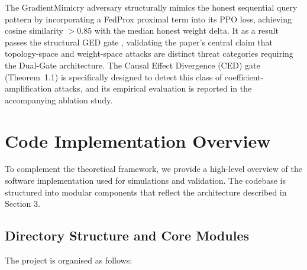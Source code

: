 \documentclass[journal]{IEEEtran}
\begin{document}
The GradientMimicry adversary structurally mimics the honest sequential query pattern by incorporating a FedProx proximal term into its PPO loss, achieving cosine similarity $>0.85$ with the median honest weight delta. It as a result passes the structural GED gate ,  validating the paper's central claim that topology-space and weight-space attacks are distinct threat categories requiring the Dual-Gate architecture. The Causal Effect Divergence (CED) gate (Theorem~1.1) is specifically designed to detect this class of coefficient-amplification attacks, and its empirical evaluation is reported in the accompanying ablation study.



\section{Code Implementation Overview}
\label{sec:code}

To complement the theoretical framework, we provide a high-level overview of the software implementation used for simulations and validation. The codebase is structured into modular components that reflect the architecture described in Section 3.

\subsection{Directory Structure and Core Modules}

The project is organised as follows:
\end{document}
